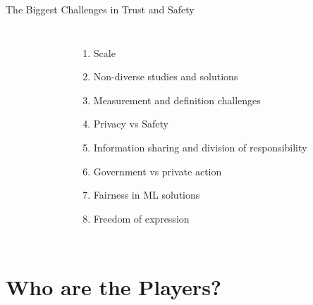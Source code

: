 \documentclass[nobackground,dvipsnames,table]{beamer}
\begin{document}
\begin{frame}{The Biggest Challenges in Trust and Safety}
\begin{columns}
\begin{figure}
                \end{figure}
                \begin{enumerate}
                    \item Scale
                    \item Non-diverse studies and solutions
                    \item Measurement and definition challenges
                    \item Privacy vs Safety
                    \item Information sharing and division of responsibility
                    \item Government vs private action
                    \item Fairness in ML solutions
                    \item Freedom of expression
                \end{enumerate}
        \end{columns}
\end{frame}

\section{Who are the Players?}
\end{document}
